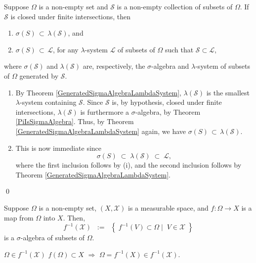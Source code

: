 \begin{corollary}\label{SigmaAlgebraContainedInPiSystem}
\quad
Suppose $\Omega$ is a non-empty set and $\mathcal{S}$ is a non-empty collection of subsets of $\Omega$.
\vskip 0.1cm
\noindent
If $\mathcal{S}$ is closed under finite intersections, then
\begin{enumerate}
\item	$\sigma\!\left(S\right)\,\subset\,\lambda\!\left(\mathcal{S}\right)$, and
\item	$\sigma\!\left(S\right)\,\subset\,\mathcal{L}$, \;for any $\lambda$-system $\mathcal{L}$ of subsets of $\Omega$
		such that $\mathcal{S}\subset\mathcal{L}$,
\end{enumerate}
where $\sigma\!\left(\mathcal{S}\right)$ and $\lambda\!\left(\mathcal{S}\right)$
are, respectively, the $\sigma$-algebra and $\lambda$-system of subsets of $\Omega$ generated by $\mathcal{S}$.
\end{corollary}
\proof
\begin{enumerate}
\item
	By Theorem \ref{GeneratedSigmaAlgebraLambdaSystem}, $\lambda(\mathcal{S})$ is the
	smallest $\lambda$-system containing $\mathcal{S}$.
	Since $\mathcal{S}$ is, by hypothesis, closed under finite intersections,
	$\lambda(\mathcal{S})$ is furthermore a $\sigma$-algebra, by Theorem \ref{PiIsSigmaAlgebra}.
	Thus, by Theorem \ref{GeneratedSigmaAlgebraLambdaSystem} again, we have
	$\sigma\!\left(S\right)\,\subset\,\lambda\!\left(\mathcal{S}\right)$.
\item
	This is now immediate since
	\begin{equation*}
	\sigma\!\left(S\right)
	\; \subset \; \lambda\!\left(\mathcal{S}\right)
	\; \subset \; \mathcal{L},
	\end{equation*}
	where the first inclusion follows by (i), and the second inclusion follows by
	Theorem \ref{GeneratedSigmaAlgebraLambdaSystem}.
\end{enumerate}
\qed

\begin{lemma}
\label{PreimagePreservesSigmaAlgebra}
\mbox{}\vskip 0.1cm
\noindent
Suppose $\Omega$ is a non-empty set, $(X,\mathcal{X})$
is a measurable space, and $f : \Omega \longrightarrow X$
is a map from $\Omega$ into $X$. Then,
\begin{equation*}
f^{-1}\!\left(\mathcal{X}\right)
\;\; := \;\;
\left\{\;
f^{-1}\!\left(V\right) \subset \Omega
\;\left\vert\;\;
V \in \mathcal{X}
\right.
\;\right\}
\end{equation*}
is a $\sigma$-algebra of subsets of $\Omega$.
\end{lemma}
\proof
\vskip 0.2cm
\noindent
\underline{$\Omega \in f^{-1}\!\left(\mathcal{X}\right)$}\quad
$f(\Omega) \subset X$ \;$\Longrightarrow$\; $\Omega = f^{-1}(X) \in f^{-1}\!\left(\mathcal{X}\right)$.

